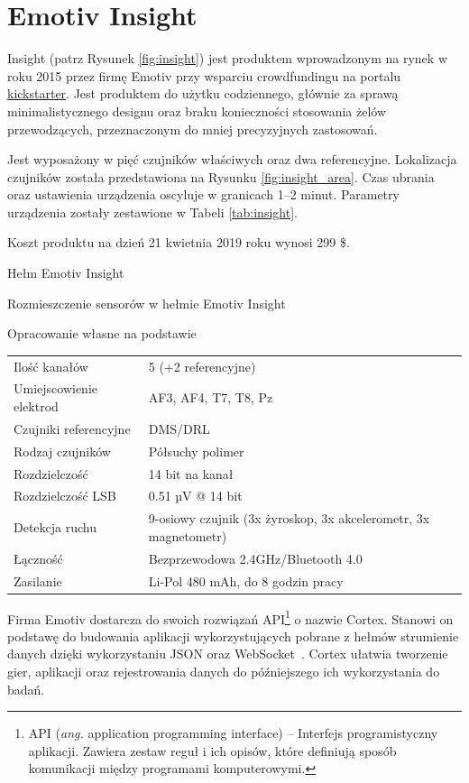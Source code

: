 \documentclass[skorowidz,skroty]{dyplomWEZUT}
\begin{document}
\section{Emotiv Insight\label{section:insight}}
Insight (patrz Rysunek \vref{fig:insight}) jest produktem wprowadzonym na rynek w roku 2015 przez firmę Emotiv przy wsparciu crowdfundingu na portalu \href{www.kickstarter.com}{kickstarter}. Jest produktem do użytku codziennego, głównie za sprawą minimalistycznego designu oraz braku konieczności stosowania żelów przewodzących, przeznaczonym do mniej precyzyjnych zastosowań.

Jest wyposażony w pięć czujników właściwych oraz dwa referencyjne. Lokalizacja czujników została przedstawiona na Rysunku \vref{fig:insight_area}. Czas ubrania oraz ustawienia urządzenia oscyluje w granicach 1--2 minut. Parametry urządzenia zostały zestawione w Tabeli \vref{tab:insight}.

Koszt produktu na dzień 21 kwietnia 2019 roku wynosi 299 \$.

{Hełm Emotiv Insight\label{fig:insight}}
{\cite{emotiv_insight}}

{Rozmieszczenie sensorów w hełmie Emotiv Insight\label{fig:insight_area}}
{\cite{emotiv_insight}}

{Opracowanie własne na podstawie~\cite{emotiv_comparison}}
{
    \begin{tabular}{l|l}
        Ilość kanałów & 5 (+2 referencyjne)\\
        Umiejscowienie elektrod & AF3, AF4, T7, T8, Pz\\
        Czujniki referencyjne & DMS/DRL\\
        Rodzaj czujników & Półsuchy polimer\\
        Rozdzielczość & 14 bit na kanał\\
        Rozdzielczość LSB & 0.51 µV @ 14 bit\\
        Detekcja ruchu & 9-osiowy czujnik (3x żyroskop, 3x akcelerometr, 3x magnetometr)\\
        Łączność & Bezprzewodowa 2.4GHz/Bluetooth 4.0\\
        Zasilanie & Li-Pol 480 mAh, do 8 godzin pracy
    \end{tabular}
}

Firma Emotiv dostarcza do swoich rozwiązań API\footnote{API (\textit{ang.} application programming interface) -- Interfejs programistyczny aplikacji. Zawiera zestaw reguł i ich opisów, które definiują sposób komunikacji między programami komputerowymi.\label{foot:api}} o nazwie Cortex. Stanowi on podstawę do budowania aplikacji wykorzystujących pobrane z hełmów strumienie danych dzięki wykorzystaniu JSON oraz WebSocket~\cite{emotiv_developer}. Cortex ułatwia tworzenie gier, aplikacji oraz rejestrowania danych do późniejszego ich wykorzystania do badań.
\end{document}
